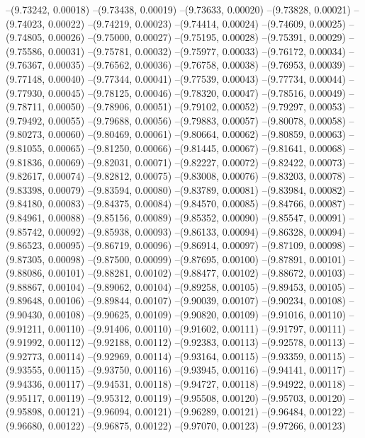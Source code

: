 --(9.73242, 0.00018)
--(9.73438, 0.00019)
--(9.73633, 0.00020)
--(9.73828, 0.00021)
--(9.74023, 0.00022)
--(9.74219, 0.00023)
--(9.74414, 0.00024)
--(9.74609, 0.00025)
--(9.74805, 0.00026)
--(9.75000, 0.00027)
--(9.75195, 0.00028)
--(9.75391, 0.00029)
--(9.75586, 0.00031)
--(9.75781, 0.00032)
--(9.75977, 0.00033)
--(9.76172, 0.00034)
--(9.76367, 0.00035)
--(9.76562, 0.00036)
--(9.76758, 0.00038)
--(9.76953, 0.00039)
--(9.77148, 0.00040)
--(9.77344, 0.00041)
--(9.77539, 0.00043)
--(9.77734, 0.00044)
--(9.77930, 0.00045)
--(9.78125, 0.00046)
--(9.78320, 0.00047)
--(9.78516, 0.00049)
--(9.78711, 0.00050)
--(9.78906, 0.00051)
--(9.79102, 0.00052)
--(9.79297, 0.00053)
--(9.79492, 0.00055)
--(9.79688, 0.00056)
--(9.79883, 0.00057)
--(9.80078, 0.00058)
--(9.80273, 0.00060)
--(9.80469, 0.00061)
--(9.80664, 0.00062)
--(9.80859, 0.00063)
--(9.81055, 0.00065)
--(9.81250, 0.00066)
--(9.81445, 0.00067)
--(9.81641, 0.00068)
--(9.81836, 0.00069)
--(9.82031, 0.00071)
--(9.82227, 0.00072)
--(9.82422, 0.00073)
--(9.82617, 0.00074)
--(9.82812, 0.00075)
--(9.83008, 0.00076)
--(9.83203, 0.00078)
--(9.83398, 0.00079)
--(9.83594, 0.00080)
--(9.83789, 0.00081)
--(9.83984, 0.00082)
--(9.84180, 0.00083)
--(9.84375, 0.00084)
--(9.84570, 0.00085)
--(9.84766, 0.00087)
--(9.84961, 0.00088)
--(9.85156, 0.00089)
--(9.85352, 0.00090)
--(9.85547, 0.00091)
--(9.85742, 0.00092)
--(9.85938, 0.00093)
--(9.86133, 0.00094)
--(9.86328, 0.00094)
--(9.86523, 0.00095)
--(9.86719, 0.00096)
--(9.86914, 0.00097)
--(9.87109, 0.00098)
--(9.87305, 0.00098)
--(9.87500, 0.00099)
--(9.87695, 0.00100)
--(9.87891, 0.00101)
--(9.88086, 0.00101)
--(9.88281, 0.00102)
--(9.88477, 0.00102)
--(9.88672, 0.00103)
--(9.88867, 0.00104)
--(9.89062, 0.00104)
--(9.89258, 0.00105)
--(9.89453, 0.00105)
--(9.89648, 0.00106)
--(9.89844, 0.00107)
--(9.90039, 0.00107)
--(9.90234, 0.00108)
--(9.90430, 0.00108)
--(9.90625, 0.00109)
--(9.90820, 0.00109)
--(9.91016, 0.00110)
--(9.91211, 0.00110)
--(9.91406, 0.00110)
--(9.91602, 0.00111)
--(9.91797, 0.00111)
--(9.91992, 0.00112)
--(9.92188, 0.00112)
--(9.92383, 0.00113)
--(9.92578, 0.00113)
--(9.92773, 0.00114)
--(9.92969, 0.00114)
--(9.93164, 0.00115)
--(9.93359, 0.00115)
--(9.93555, 0.00115)
--(9.93750, 0.00116)
--(9.93945, 0.00116)
--(9.94141, 0.00117)
--(9.94336, 0.00117)
--(9.94531, 0.00118)
--(9.94727, 0.00118)
--(9.94922, 0.00118)
--(9.95117, 0.00119)
--(9.95312, 0.00119)
--(9.95508, 0.00120)
--(9.95703, 0.00120)
--(9.95898, 0.00121)
--(9.96094, 0.00121)
--(9.96289, 0.00121)
--(9.96484, 0.00122)
--(9.96680, 0.00122)
--(9.96875, 0.00122)
--(9.97070, 0.00123)
--(9.97266, 0.00123)
